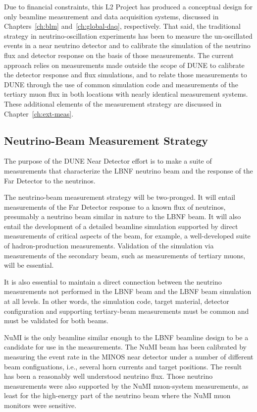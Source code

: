 Due to financial constraints, this L2 Project has produced a conceptual design for only beamline measurement and data acquisition systems, discussed in Chapters~\ref{ch:blm} and~\ref{ch:global-daq}, respectively.  
That said, the traditional strategy in neutrino-oscillation experiments has been to measure the un-oscillated events in a near neutrino detector and to calibrate the simulation of the neutrino flux
and detector response on the basis of those measurements. 
The current approach relies on measurements made outside the scope of DUNE to calibrate the detector response and flux simulations, and to relate those measurements to DUNE through the use of common simulation code and measurements of the tertiary muon flux in both locations with nearly identical
 measurement systems. 
These additional elements of the measurement strategy are discussed in Chapter~\ref{ch:ext-meas}. 

\subsection{Neutrino-Beam Measurement Strategy}
\label{subsec:nu-meas-strat}

The purpose of the DUNE Near Detector effort is to make a suite of measurements that
characterize the LBNF neutrino beam and the response of the Far Detector to the neutrinos.

The neutrino-beam measurement strategy will be two-pronged. It will entail measurements of the Far Detector response to a known flux of neutrinos, presumably a neutrino beam similar in nature to the LBNF beam. It will also entail the development of a detailed beamline simulation supported by direct measurements of critical aspects of the beam, 
for example, a well-developed suite of hadron-production measurements. Validation of the simulation via measurements of the secondary 
beam, such as measurements of tertiary muons, will be essential.

It is also essential to maintain a direct connection between the neutrino measurements not performed in the LBNF beam and the LBNF beam simulation at all levels. 
In other words, the simulation code, target material, detector configuration and supporting tertiary-beam measurements must be common and must be validated for both beams. 

NuMI is the only beamline similar enough to the LBNF beamline design to be a candidate for use in the measurements. The NuMI beam has been calibrated by measuring the event rate in the MINOS near detector under a number of different beam configuations, i.e., several horn currents and target positions. The result has been a reasonably well understood neutrino flux. Those neutrino measurements were also supported by the NuMI muon-system measurements, as least for the high-energy part of the neutrino beam where the NuMI muon monitors were sensitive. 

